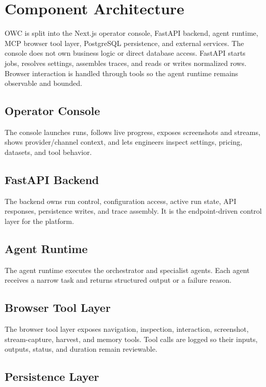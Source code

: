 \section{Component Architecture}

OWC is split into the Next.js operator console, FastAPI backend, agent runtime,
MCP browser tool layer, PostgreSQL persistence, and external services. The
console does not own business logic or direct database access. FastAPI starts
jobs, resolves settings, assembles traces, and reads or writes normalized rows.
Browser interaction is handled through tools so the agent runtime remains
observable and bounded.



\subsection{Operator Console}

The console launches runs, follows live progress, exposes screenshots and
streams, shows provider/channel context, and lets engineers inspect settings,
pricing, datasets, and tool behavior.

\subsection{FastAPI Backend}

The backend owns run control, configuration access, active run state, API
responses, persistence writes, and trace assembly. It is the endpoint-driven
control layer for the platform.

\subsection{Agent Runtime}

The agent runtime executes the orchestrator and specialist agents. Each agent
receives a narrow task and returns structured output or a failure reason.

\subsection{Browser Tool Layer}

The browser tool layer exposes navigation, inspection, interaction, screenshot,
stream-capture, harvest, and memory tools. Tool calls are logged so their
inputs, outputs, status, and duration remain reviewable.

\subsection{Persistence Layer}

